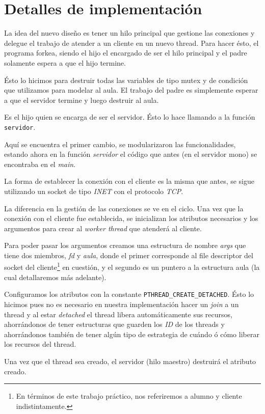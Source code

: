 \documentclass[a4paper]{article}
\begin{document}
\section{Detalles de implementación}
La idea del nuevo diseño es tener un hilo principal que gestione las
conexiones y delegue el trabajo de atender a un cliente en un nuevo thread.
Para hacer ésto, el programa forkea, siendo el hijo el encargado de ser el
hilo principal y el padre solamente espera a que el hijo termine.

Ésto lo hicimos para destruir todas las variables de tipo mutex y de
condición que utilizamos para modelar al aula. El trabajo del padre es
simplemente esperar a que el servidor termine y luego destruir al aula.

Es el hijo quien se encarga de ser el servidor. Ésto lo hace llamando a la
función \verb|servidor|.

Aquí se encuentra el primer cambio, se modularizaron las funcionalidades,
estando ahora en la función \textit{servidor} el código que antes (en el
servidor mono) se encontraba en el \textit{main}.

La forma de establecer la conexión con el cliente es la misma que antes, se
sigue utilizando un socket de tipo \textit{INET} con el protocolo
\textit{TCP}.

La diferencia en la gestión de las conexiones se ve en el ciclo. Una vez que
la conexión con el cliente fue establecida, se inicializan los atributos
necesarios y los argumentos para crear al \textit{worker thread} que
atenderá al cliente.

Para poder pasar los argumentos creamos una estructura de nombre
\textit{args} que tiene dos miembros, \textit{fd} y \textit{aula}, donde el
primer corresponde al file descriptor del socket del cliente\footnote{En
términos de este trabajo práctico, nos referiremos a alumno y cliente
indistintamente.} en cuestión, y el segundo es un puntero a la estructura
aula (la cual detallaremos más adelante).

Configuramos los atributos con la constante \verb|PTHREAD_CREATE_DETACHED|.
Ésto lo hicimos pues no es necesario en nuestra implementación hacer un
\textit{join} a un thread y al estar \textit{detached} el thread libera
automáticamente sus recursos, ahorrándonos de tener estructuras que guarden
los \textit{ID} de los threads y ahorrándonos también de tener algún tipo de
estrategia de cuándo ó cómo liberar los recursos del thread.

Una vez que el thread sea creado, el servidor (hilo maestro) destruirá el
atributo creado.
\end{document}
